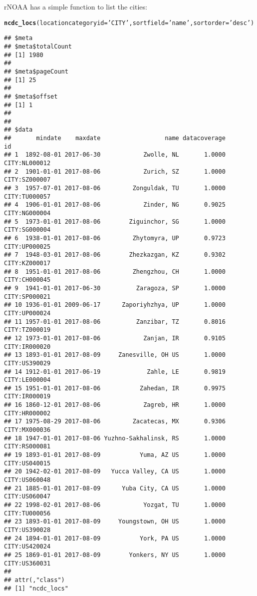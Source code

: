 \documentclass{article}\usepackage[]{graphicx}\usepackage[]{color}
\makeatletter
\newcommand{\hlstr}[1]{\textcolor[rgb]{0.192,0.494,0.8}{#1}}%
\newcommand{\hlstd}[1]{\textcolor[rgb]{0.345,0.345,0.345}{#1}}%
\newcommand{\hlkwc}[1]{\textcolor[rgb]{0.333,0.667,0.333}{#1}}%
\newcommand{\hlkwd}[1]{\textcolor[rgb]{0.737,0.353,0.396}{\textbf{#1}}}%
\newenvironment{kframe}{%
 \def\at@end@of@kframe{}%
 \ifinner\ifhmode%
  \def\at@end@of@kframe{\end{minipage}}%
  \begin{minipage}{\columnwidth}%
 \fi\fi%
 \def\FrameCommand##1{\hskip\@totalleftmargin \hskip-\fboxsep
 \colorbox{shadecolor}{##1}\hskip-\fboxsep
     \hskip-\linewidth \hskip-\@totalleftmargin \hskip\columnwidth}%
 \MakeFramed {\advance\hsize-\width
   \@totalleftmargin\z@ \linewidth\hsize
   \@setminipage}}%
 {\par\unskip\endMakeFramed%
 \at@end@of@kframe}
\newenvironment{knitrout}{}{} %
\makeatother
\begin{document}
rNOAA has a simple function to list the cities:
\begin{knitrout}
\color{fgcolor}\begin{kframe}
\begin{alltt}
\hlkwd{ncdc_locs}\hlstd{(}\hlkwc{locationcategoryid}\hlstd{=}\hlstr{'CITY'}\hlstd{,} \hlkwc{sortfield}\hlstd{=}\hlstr{'name'}\hlstd{,} \hlkwc{sortorder}\hlstd{=}\hlstr{'desc'}\hlstd{)}
\end{alltt}
\begin{verbatim}
## $meta
## $meta$totalCount
## [1] 1980
## 
## $meta$pageCount
## [1] 25
## 
## $meta$offset
## [1] 1
## 
## 
## $data
##       mindate    maxdate                  name datacoverage            id
## 1  1892-08-01 2017-06-30            Zwolle, NL       1.0000 CITY:NL000012
## 2  1901-01-01 2017-08-06            Zurich, SZ       1.0000 CITY:SZ000007
## 3  1957-07-01 2017-08-06         Zonguldak, TU       1.0000 CITY:TU000057
## 4  1906-01-01 2017-08-06            Zinder, NG       0.9025 CITY:NG000004
## 5  1973-01-01 2017-08-06        Ziguinchor, SG       1.0000 CITY:SG000004
## 6  1938-01-01 2017-08-06         Zhytomyra, UP       0.9723 CITY:UP000025
## 7  1948-03-01 2017-08-06        Zhezkazgan, KZ       0.9302 CITY:KZ000017
## 8  1951-01-01 2017-08-06         Zhengzhou, CH       1.0000 CITY:CH000045
## 9  1941-01-01 2017-06-30          Zaragoza, SP       1.0000 CITY:SP000021
## 10 1936-01-01 2009-06-17      Zaporiyhzhya, UP       1.0000 CITY:UP000024
## 11 1957-01-01 2017-08-06          Zanzibar, TZ       0.8016 CITY:TZ000019
## 12 1973-01-01 2017-08-06            Zanjan, IR       0.9105 CITY:IR000020
## 13 1893-01-01 2017-08-09     Zanesville, OH US       1.0000 CITY:US390029
## 14 1912-01-01 2017-06-19             Zahle, LE       0.9819 CITY:LE000004
## 15 1951-01-01 2017-08-06           Zahedan, IR       0.9975 CITY:IR000019
## 16 1860-12-01 2017-08-06            Zagreb, HR       1.0000 CITY:HR000002
## 17 1975-08-29 2017-08-06         Zacatecas, MX       0.9306 CITY:MX000036
## 18 1947-01-01 2017-08-06 Yuzhno-Sakhalinsk, RS       1.0000 CITY:RS000081
## 19 1893-01-01 2017-08-09           Yuma, AZ US       1.0000 CITY:US040015
## 20 1942-02-01 2017-08-09   Yucca Valley, CA US       1.0000 CITY:US060048
## 21 1885-01-01 2017-08-09      Yuba City, CA US       1.0000 CITY:US060047
## 22 1998-02-01 2017-08-06            Yozgat, TU       1.0000 CITY:TU000056
## 23 1893-01-01 2017-08-09     Youngstown, OH US       1.0000 CITY:US390028
## 24 1894-01-01 2017-08-09           York, PA US       1.0000 CITY:US420024
## 25 1869-01-01 2017-08-09        Yonkers, NY US       1.0000 CITY:US360031
## 
## attr(,"class")
## [1] "ncdc_locs"
\end{verbatim}
\end{kframe}
\end{knitrout}
\end{document}
